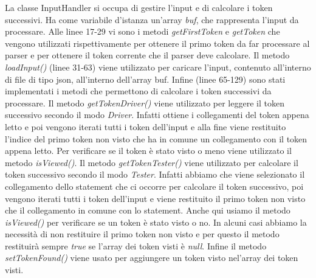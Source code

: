 La classe InputHandler si occupa di gestire l'input e di calcolare i token successivi. Ha come variabile d'istanza un'array \textit{buf}, che rappresenta l'input da processare. Alle linee 17-29 vi sono i metodi \textit{getFirstToken} e \textit{getToken} che vengono utilizzati rispettivamente per ottenere il primo token da far processare al parser e per ottenere il token corrente che il parser deve calcolare. Il metodo \textit{loadInput()} (linee 31-63) viene utilizzato per caricare l'input, contenuto all'interno di file di tipo json, all'interno dell'array buf. Infine (linee 65-129) sono stati implementati i metodi che permettono di  calcolare i token successivi da processare. Il metodo \textit{getTokenDriver()} viene utilizzato per leggere il token successivo secondo il modo \textit{Driver}. Infatti ottiene i collegamenti del token appena letto e poi vengono iterati tutti i token dell'input e alla fine viene restituito l'indice del primo token non visto che ha in comune un collegamento con il token appena letto. Per verificare se il token è stato visto o meno viene utilizzato il metodo \textit{isViewed()}. Il metodo \textit{getTokenTester()} viene utilizzato per calcolare il token successivo secondo il modo \textit{Tester}. Infatti abbiamo che viene selezionato il collegamento dello statement che ci occorre per calcolare il token successivo, poi vengono iterati tutti i token dell'input e viene restituito il primo token non visto che il collegamento in comune con lo statement. Anche qui usiamo il metodo \textit{isViewed()} per verificare se un token è stato visto o no. In alcuni casi abbiamo la necessità di non restituire il primo token non visto e per questo il metodo restituirà sempre \textit{true} se l'array dei token visti è \textit{null}. Infine il metodo \textit{setTokenFound()} viene usato per aggiungere un token visto nel'array dei token visti.
